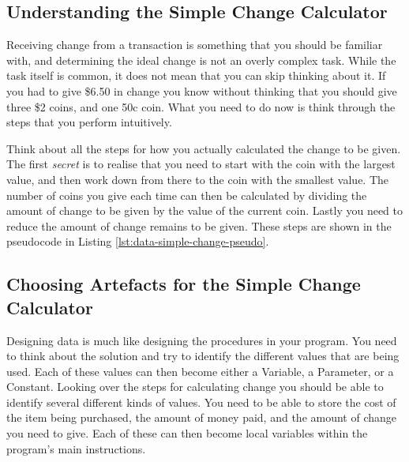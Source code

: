 
\subsection{Understanding the Simple Change Calculator} %
\label{sub:understanding_simple_change}

Receiving change from a transaction is something that you should be familiar with, and determining the ideal change is not an overly complex task. While the task itself is common, it does not mean that you can skip thinking about it. If you had to give \$6.50 in change you know without thinking that you should give three \$2 coins, and one 50c coin. What you need to do now is think through the steps that you perform intuitively.

Think about all the steps for how you actually calculated the change to be given. The first \emph{secret} is to realise that you need to start with the coin with the largest value, and then work down from there to the coin with the smallest value. The number of coins you give each time can then be calculated by dividing the amount of change to be given by the value of the current coin. Lastly you need to reduce the amount of change remains to be given. These steps are shown in the pseudocode in Listing \ref{lst:data-simple-change-pseudo}.


\subsection{Choosing Artefacts for the Simple Change Calculator} %
\label{sub:choosing_artefacts_for_simple_change}

Designing data is much like designing the procedures in your program. You need to think about the solution and try to identify the different values that are being used. Each of these values can then become either a Variable, a Parameter, or a Constant. Looking over the steps for calculating change you should be able to identify several different kinds of values. You need to be able to store the cost of the item being purchased, the amount of money paid, and the amount of change you need to give. Each of these can then become local variables within the program's main instructions.

